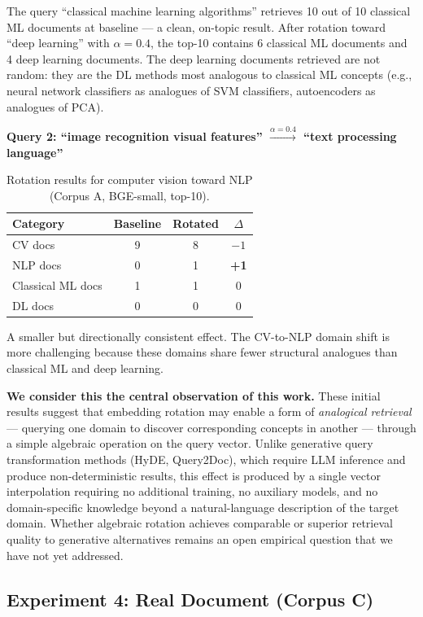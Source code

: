 \documentclass{article}
\begin{document}
The query ``classical machine learning algorithms'' retrieves 10 out of 10 classical ML documents at baseline --- a clean, on-topic result. After rotation toward ``deep learning'' with $\alpha = 0.4$, the top-10 contains 6 classical ML documents and 4 deep learning documents. The deep learning documents retrieved are not random: they are the DL methods most analogous to classical ML concepts (e.g., neural network classifiers as analogues of SVM classifiers, autoencoders as analogues of PCA).

\textbf{Query 2: ``image recognition visual features'' $\xrightarrow{\alpha=0.4}$ ``text processing language''}

\begin{table}[ht]
\centering
\caption{Rotation results for computer vision toward NLP (Corpus A, BGE-small, top-10).}
\label{tab:exp3b}
\begin{tabular}{lccc}
\toprule
Category & Baseline & Rotated & $\Delta$ \\
\midrule
CV docs & 9 & 8 & $-1$ \\
NLP docs & 0 & 1 & \textbf{+1} \\
Classical ML docs & 1 & 1 & 0 \\
DL docs & 0 & 0 & 0 \\
\bottomrule
\end{tabular}
\end{table}

A smaller but directionally consistent effect. The CV-to-NLP domain shift is more challenging because these domains share fewer structural analogues than classical ML and deep learning.

\textbf{We consider this the central observation of this work.} These initial results suggest that embedding rotation may enable a form of \emph{analogical retrieval} --- querying one domain to discover corresponding concepts in another --- through a simple algebraic operation on the query vector. Unlike generative query transformation methods (HyDE, Query2Doc), which require LLM inference and produce non-deterministic results, this effect is produced by a single vector interpolation requiring no additional training, no auxiliary models, and no domain-specific knowledge beyond a natural-language description of the target domain. Whether algebraic rotation achieves comparable or superior retrieval quality to generative alternatives remains an open empirical question that we have not yet addressed.

\subsection{Experiment 4: Real Document (Corpus C)}
\end{document}

